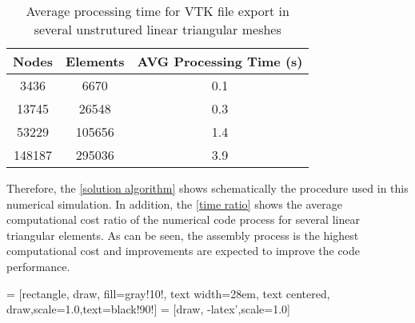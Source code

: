 \vspace{0.5cm}
\begin{table}[H]
\centering
\begin{tabular}{ccc}
\toprule
\textbf{Nodes} & \textbf{Elements} & \textbf{AVG Processing Time} (s) \\
\midrule
3436 & 6670 & 0.1 \\
13745 & 26548 & 0.3 \\
53229 & 105656 & 1.4 \\
148187 & 295036 & 3.9 \\



\bottomrule
\end{tabular}
\caption{Average processing time for VTK file export in several unstrutured linear triangular meshes}
\label{tempo export vtk}
\end{table}

\medskip
Therefore, the \ref{solution algorithm} shows schematically the procedure used
in this numerical simulation.
In addition, the \ref{time ratio} shows the average computational
cost ratio
of the numerical code process for several linear triangular elements. 
As can be seen,
the assembly process is the highest computational cost
and improvements are expected to improve the code performance.



\vspace{0.5cm}
 = [rectangle, draw, fill=gray!10!,
    text width=28em, text centered, draw,scale=1.0,text=black!90!]
 = [draw, -latex',scale=1.0]



